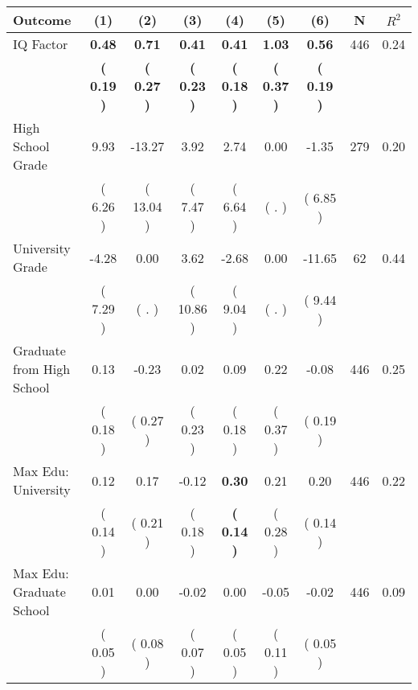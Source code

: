 \begin{tabular}{lcccccccc}
\toprule
 \textbf{Outcome} & \textbf{(1)} & \textbf{(2)} & \textbf{(3)} & \textbf{(4)} & \textbf{(5)} & \textbf{(6)} & \textbf{N} & \textbf{$ R^2$} \\
\midrule
IQ Factor & \textbf{     0.48} & \textbf{     0.71} & \textbf{     0.41} & \textbf{     0.41} & \textbf{     1.03} & \textbf{     0.56} & 446 &       0.24 \\ 
 & \textbf{(     0.19 )} & \textbf{(     0.27 )} & \textbf{(     0.23 )} & \textbf{(     0.18 )} & \textbf{(     0.37 )} & \textbf{(     0.19 )} & \\
High School Grade &      9.93 &    -13.27 &      3.92 &      2.74 &      0.00 &     -1.35 & 279 &       0.20 \\ 
 & (     6.26 ) & (    13.04 ) & (     7.47 ) & (     6.64 ) & (        . ) & (     6.85 ) & \\
University Grade &     -4.28 &      0.00 &      3.62 &     -2.68 &      0.00 &    -11.65 & 62 &       0.44 \\ 
 & (     7.29 ) & (        . ) & (    10.86 ) & (     9.04 ) & (        . ) & (     9.44 ) & \\
Graduate from High School &      0.13 &     -0.23 &      0.02 &      0.09 &      0.22 &     -0.08 & 446 &       0.25 \\ 
 & (     0.18 ) & (     0.27 ) & (     0.23 ) & (     0.18 ) & (     0.37 ) & (     0.19 ) & \\
Max Edu: University &      0.12 &      0.17 &     -0.12 & \textbf{     0.30} &      0.21 &      0.20 & 446 &       0.22 \\ 
 & (     0.14 ) & (     0.21 ) & (     0.18 ) & \textbf{(     0.14 )} & (     0.28 ) & (     0.14 ) & \\
Max Edu: Graduate School &      0.01 &      0.00 &     -0.02 &      0.00 &     -0.05 &     -0.02 & 446 &       0.09 \\ 
 & (     0.05 ) & (     0.08 ) & (     0.07 ) & (     0.05 ) & (     0.11 ) & (     0.05 ) & \\
\bottomrule
\end{tabular}

